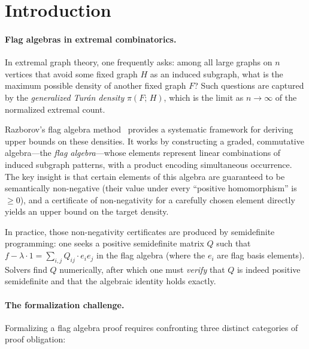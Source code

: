 \documentclass{article}
\newcommand{\tdensity}[2]{\pi(#1;\,#2)}
\begin{document}
\section{Introduction}
\label{sec:intro}

\paragraph{Flag algebras in extremal combinatorics.}
In extremal graph theory, one frequently asks: among all large graphs on $n$
vertices that avoid some fixed graph $H$ as an induced subgraph, what is the
maximum possible density of another fixed graph $F$?  Such questions are
captured by the \emph{generalized Turán density} $\tdensity{F}{H}$, which is
the limit as $n\to\infty$ of the normalized extremal count.

Razborov's flag algebra method~\cite{razborov2007flag} provides a systematic
framework for deriving upper bounds on these densities.  It works by
constructing a graded, commutative algebra---the \emph{flag algebra}---whose
elements represent linear combinations of induced subgraph patterns, with a
product encoding simultaneous occurrence.  The key insight is that certain
elements of this algebra are guaranteed to be semantically non-negative (their
value under every ``positive homomorphism'' is $\geq 0$), and a certificate of
non-negativity for a carefully chosen element directly yields an upper bound on
the target density.

In practice, those non-negativity certificates are produced by semidefinite
programming: one seeks a positive semidefinite matrix $Q$ such that
$f - \lambda \cdot 1 = \sum_{i,j} Q_{ij} \cdot e_i e_j$ in the flag algebra
(where the $e_i$ are flag basis elements).  Solvers find $Q$ numerically, after
which one must \emph{verify} that $Q$ is indeed positive semidefinite and that
the algebraic identity holds exactly.

\paragraph{The formalization challenge.}
Formalizing a flag algebra proof requires confronting three distinct categories
of proof obligation:
\end{document}
